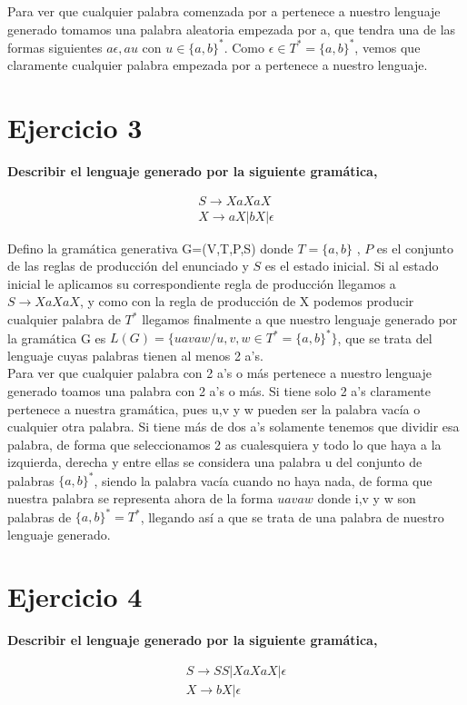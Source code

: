 \documentclass[a4paper,11pt]{article}
\begin{document}
Para ver que cualquier palabra comenzada por a pertenece a nuestro lenguaje generado tomamos una palabra aleatoria empezada por a, que tendra una de las formas siguientes $a\epsilon, au$ con $u \in \{a,b\}^*$. Como $\epsilon \in T^*=\{a,b\}^*$, vemos que claramente cualquier palabra empezada por a pertenece a nuestro lenguaje.

\section{Ejercicio 3}
\textbf{Describir el lenguaje generado por la siguiente gramática,}

\begin{align*}
S \rightarrow XaXaX \\ X \rightarrow aX|bX|\epsilon
\end{align*}

Defino la gramática generativa G=(V,T,P,S) donde $T=\{a,b\}$ , $P$ es el conjunto de las reglas de producción del enunciado y $S$ es el estado inicial. Si al estado inicial le aplicamos su correspondiente regla de producción llegamos a $S \rightarrow XaXaX$, y como con la regla de producción de X podemos producir cualquier palabra de $T^*$ llegamos finalmente a que nuestro lenguaje generado por la gramática G es $L(G)=\{uavaw /u,v,w \in T^*=\{a,b\}^*\}$, que se trata del lenguaje cuyas palabras tienen al menos 2 a's. \\

Para ver que cualquier palabra con 2 a's o más pertenece a nuestro lenguaje generado toamos una palabra con 2 a's o más. Si tiene solo 2 a's claramente pertenece a nuestra gramática, pues u,v y w pueden ser la palabra vacía o cualquier otra palabra. Si tiene más de dos a's solamente tenemos que dividir esa palabra, de forma que seleccionamos 2 as cualesquiera y todo lo que haya a la izquierda, derecha y entre ellas se considera una palabra u del conjunto de palabras $\{a,b\}^*$, siendo la palabra vacía cuando no haya nada, de forma que nuestra palabra se representa ahora de la forma $uavaw$ donde i,v y w son palabras de $\{a,b\}^* = T^*$, llegando así a que se trata de una palabra de nuestro lenguaje generado.

\section{Ejercicio 4}
\textbf{Describir el lenguaje generado por la siguiente gramática,}

\begin{align*}
S \rightarrow SS | XaXaX | \epsilon \\
X \rightarrow bX|\epsilon
\end{align*}
\end{document}
